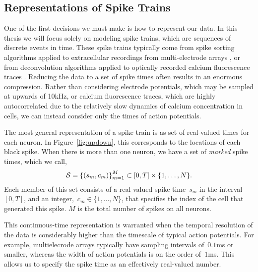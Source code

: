 \subsection{Representations of Spike Trains}
One of the first decisions we must make is how to
represent our data. In this thesis we will focus solely on modeling
spike trains, which are sequences of discrete events in time. These
spike trains typically come from spike sorting algorithms applied to
extracellular recordings from multi-electrode arrays
\cite{lewicki1998review}, or from
deconvolution algorithms applied to optically recorded calcium
fluorescence traces \cite{pnevmatikakis2016simultaneous,
  vogelstein2010fast}. Reducing the data to a set of spike times often 
results in an enormous compression. Rather than considering electrode 
potentials, which may be sampled at upwards of 10kHz, or calcium 
fluorescence traces, which are highly autocorrelated due to the relatively 
slow dynamics of calcium concentration in cells, we can instead consider 
only the times of action potentials.


The most general representation 
of a spike train is as set of real-valued times for each neuron.
In Figure~\ref{fig:updown}, this corresponds to the locations of
each black spike.
When there is more than one neuron, we have a set of
\emph{marked} spike times, which we call,
\begin{align*}
  \mathcal{S} = \left \{ (s_m, c_m) \right \}_{m=1}^M \subset [0, T] \times \{1, \ldots, N\}.
\end{align*}
Each member of this set consists of a real-valued spike time~$s_m$ in
the interval~$[0, T]$, and an integer,~$c_m \in \{1, \ldots, N\}$,
that specifies the index of the cell that generated this spike. $M$ is 
the total number of spikes on all neurons.

This continuous-time representation is
warranted when the temporal resolution of the data is considerably
higher than the timescale of typical action potentials. For example,
multielecrode arrays typically have sampling intervals of~$0.1$ms or
smaller, whereas the width of action potentials is on the order
of~$1$ms. This allows us to specify the spike time as an effectively
real-valued number.  

